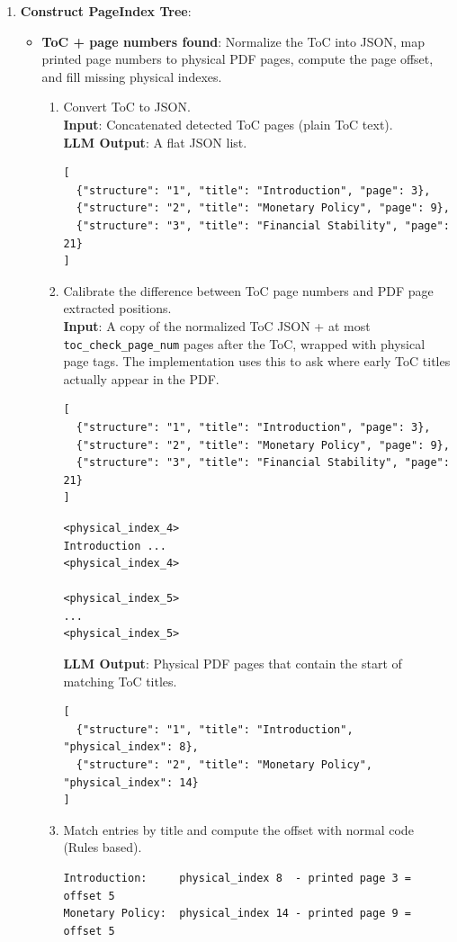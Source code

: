 \documentclass[11pt,a4paper]{article}
\newcommand{\fieldname}[1]{\textcolor{red!70!black}{\texttt{#1}}}
\begin{document}
\begin{enumerate}
    \item \textbf{Construct PageIndex Tree}: 
    \begin{itemize}
        \item \textbf{ToC + page numbers found}: Normalize the ToC into JSON, map printed page numbers to physical PDF pages, compute the page offset, and fill missing physical indexes.
        \begin{enumerate}[label=(\alph*)]
            \item  Convert ToC to JSON. \\
            \textbf{Input}: Concatenated detected ToC pages (plain ToC text). \\
            \textbf{LLM Output}: A flat JSON list.
\begin{lstlisting}[style=pageTextBlockInList]
[
  {"structure": "1", "title": "Introduction", "page": 3},
  {"structure": "2", "title": "Monetary Policy", "page": 9},
  {"structure": "3", "title": "Financial Stability", "page": 21}
]
\end{lstlisting}
            \item Calibrate the difference between ToC page numbers and PDF page extracted positions. \\
            \textbf{Input}: A copy of the normalized ToC JSON + at most \fieldname{toc\_check\_page\_num} pages after the ToC, wrapped with physical page tags. The implementation uses this to ask where early ToC titles actually appear in the PDF.

\begin{lstlisting}[style=pageTextBlockInList]
[
  {"structure": "1", "title": "Introduction", "page": 3},
  {"structure": "2", "title": "Monetary Policy", "page": 9},
  {"structure": "3", "title": "Financial Stability", "page": 21}
]
\end{lstlisting}
\begin{lstlisting}[style=pageTextBlockInList]
<physical_index_4>
Introduction ...
<physical_index_4>

<physical_index_5>
...
<physical_index_5>
\end{lstlisting}
\textbf{LLM Output}: Physical PDF pages that contain the start of matching ToC titles.
\begin{lstlisting}[style=pageTextBlockInList]
[
  {"structure": "1", "title": "Introduction", "physical_index": 8},
  {"structure": "2", "title": "Monetary Policy", "physical_index": 14}
]
\end{lstlisting}
            \item Match entries by title and compute the offset with normal code (Rules based).
\begin{lstlisting}[style=pageTextBlockInList]
Introduction:     physical_index 8  - printed page 3 = offset 5
Monetary Policy:  physical_index 14 - printed page 9 = offset 5


\end{lstlisting}
\end{enumerate}
\end{itemize}
\end{enumerate}
\end{document}
